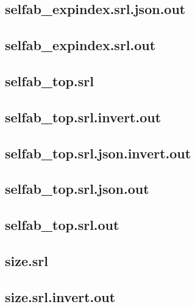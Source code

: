 \subsection{selfab\_expindex.srl.json.out}
\label{app:selfab_expindex_srl.json.out}

\subsection{selfab\_expindex.srl.out}
\label{app:selfab_expindex_srl.out}

\subsection{selfab\_top.srl}
\label{app:selfab_top_srl}

\subsection{selfab\_top.srl.invert.out}
\label{app:selfab_top_srl.invert.out}

\subsection{selfab\_top.srl.json.invert.out}
\label{app:selfab_top_srl.json.invert.out}

\subsection{selfab\_top.srl.json.out}
\label{app:selfab_top_srl.json.out}

\subsection{selfab\_top.srl.out}
\label{app:selfab_top_srl.out}

\subsection{size.srl}
\label{app:size_srl}

\subsection{size.srl.invert.out}
\label{app:size_srl.invert.out}

